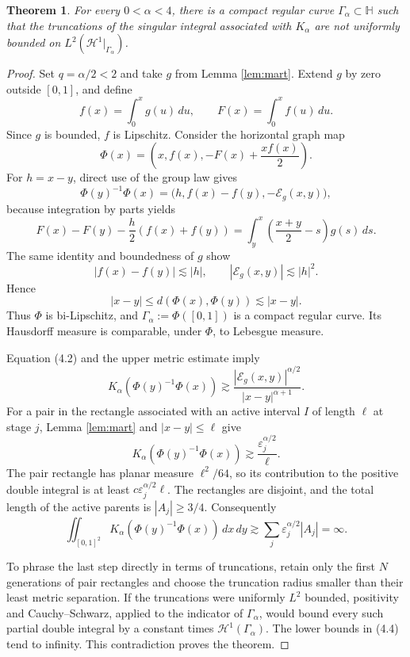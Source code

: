 \documentclass[11pt]{article}
\newtheorem{theorem}{Theorem}
\newcommand{\Hh}{\mathbb H}
\newcommand{\Ecal}{\mathcal E}
\begin{document}
\begin{theorem}\label{thm:main}
For every $0<\alpha<4$, there is a compact regular curve
$\Gamma_\alpha\subset\Hh$ such that the truncations of the singular integral
associated with $K_\alpha$ are not uniformly bounded on
$L^2(\mathcal H^1|_{\Gamma_\alpha})$.
\end{theorem}

\begin{proof}
Set $q=\alpha/2<2$ and take $g$ from Lemma \ref{lem:mart}.  Extend $g$ by
zero outside $[0,1]$, and define
\[
 f(x)=\int_0^x g(u)\,du,\qquad
 F(x)=\int_0^x f(u)\,du.
\]
Since $g$ is bounded, $f$ is Lipschitz.  Consider the horizontal graph map
\[
 \Phi(x)=\left(x,f(x),-F(x)+\frac{x f(x)}2\right).
 \tag{4.1}
\]
For $h=x-y$, direct use of the group law gives
\[
 \Phi(y)^{-1}\Phi(x)
 =\big(h,f(x)-f(y),-\Ecal_g(x,y)\big),
 \tag{4.2}
\]
because integration by parts yields
\[
 F(x)-F(y)-\frac h2(f(x)+f(y))
 =\int_y^x\left(\frac{x+y}{2}-s\right)g(s)\,ds.
\]
The same identity and boundedness of $g$ show
\[
 |f(x)-f(y)|\lesssim|h|,\qquad
 |\Ecal_g(x,y)|\lesssim |h|^2.
\]
Hence
\[
 |x-y|\leq d(\Phi(x),\Phi(y))\lesssim|x-y|.
\]
Thus $\Phi$ is bi-Lipschitz, and
$\Gamma_\alpha:=\Phi([0,1])$ is a compact regular curve.  Its Hausdorff
measure is comparable, under $\Phi$, to Lebesgue measure.

Equation (4.2) and the upper metric estimate imply
\[
 K_\alpha(\Phi(y)^{-1}\Phi(x))
 \gtrsim
 \frac{|\Ecal_g(x,y)|^{\alpha/2}}{|x-y|^{\alpha+1}}.
 \tag{4.3}
\]
For a pair in the rectangle associated with an active interval $I$ of
length $\ell$ at stage $j$, Lemma \ref{lem:mart} and $|x-y|\leq\ell$ give
\[
 K_\alpha(\Phi(y)^{-1}\Phi(x))
 \gtrsim \frac{\varepsilon_j^{\alpha/2}}{\ell}.
\]
The pair rectangle has planar measure $\ell^2/64$, so its contribution to
the positive double integral is at least
$c\varepsilon_j^{\alpha/2}\ell$.  The rectangles are disjoint, and the
total length of the active parents is $|A_j|\geq3/4$.  Consequently
\[
 \iint_{[0,1]^2}
 K_\alpha(\Phi(y)^{-1}\Phi(x))\,dx\,dy
 \gtrsim \sum_j\varepsilon_j^{\alpha/2}|A_j|=\infty.
 \tag{4.4}
\]

To phrase the last step directly in terms of truncations, retain only the
first $N$ generations of pair rectangles and choose the truncation radius
smaller than their least metric separation.  If the truncations were
uniformly $L^2$ bounded, positivity and Cauchy--Schwarz, applied to the
indicator of $\Gamma_\alpha$, would bound every such partial double integral
by a constant times $\mathcal H^1(\Gamma_\alpha)$.  The lower bounds in
(4.4) tend to infinity.  This contradiction proves the theorem.
\end{proof}
\end{document}
